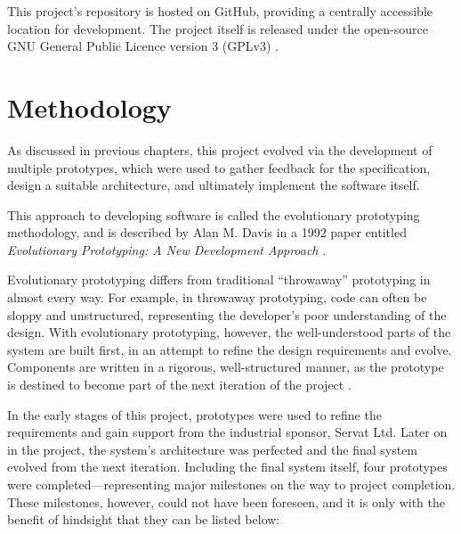 This project's repository is hosted on GitHub, providing a centrally accessible
location for development. The project itself is released under the open-source
GNU General Public Licence version 3 (GPLv3) \cite{stallman1991}.

\section{Methodology}
\label{sec:implementation-methodology}

As discussed in previous chapters, this project evolved via the development of
multiple prototypes, which were used to gather feedback for the specification,
design a suitable architecture, and ultimately implement the software itself.

This approach to developing software is called the evolutionary prototyping
methodology, and is described by Alan M. Davis in a 1992 paper entitled
\emph{Evolutionary Prototyping: A New Development Approach} \cite{davis1992}.

Evolutionary prototyping differs from traditional ``throwaway'' prototyping in
almost every way. For example, in throwaway prototyping, code can often be
sloppy and unstructured, representing the developer's poor understanding of the
design. With evolutionary prototyping, however, the well-understood parts of
the system are built first, in an attempt to refine the design requirements and
evolve. Components are written in a rigorous, well-structured manner, as the
prototype is destined to become part of the next iteration of the project
\cite{davis1992}.

In the early stages of this project, prototypes were used to refine the
requirements and gain support from the industrial sponsor, Servat Ltd. Later on
in the project, the system's architecture was perfected and the final system
evolved from the next iteration. Including the final system itself, four
prototypes were completed---representing major milestones on the way to project
completion. These milestones, however, could not have been foreseen, and it is
only with the benefit of hindsight that they can be listed below:

